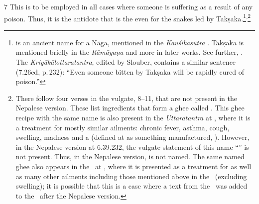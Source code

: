 \begin{translation}
\item[7]
                    This is to be employed in all cases where someone is
                    suffering as a result of any poison.  Thus, it is the
                    antidote that is  the  even for the snakes led by
                    Takṣaka.\footnote{ is an ancient name
                        for a Nāga, mentioned in the \emph{Kauśikasūtra}
                        \citep[28.1 \emph{et passim},][78]{bloo-1890}.
                        Takṣaka is mentioned briefly in the \emph{Rāmāyaṇa}
                        \citep[292, n.\,13]{poll-1991} and more in later
                        works. See further, \cite[22, 26, 37, \emph{et
                        passim}]{slou-2016}.  The
                        \emph{Kriyākālottaratantra}, edited by Slouber,
                        contains a similar sentence (7.26cd, p.\,232): “Even
                        someone bitten by Takṣaka will be rapidly cured of
                        poison.”}\textsuperscript{,}\footnote{There follow
                            four verses in the vulgate, 8--11, that are not
                            present in the Nepalese version.  These list
                            ingredients that form a ghee called
                            . This ghee recipe with
                            the same name is also present in the
                            \emph{Uttaratantra} at , where
                            it is a treatment for mostly similar ailments:
                            chronic fever, asthma, cough, swelling, madness and a
                             (defined at
                             as something manufactured,
                            ).  However, in the Nepalese version at
                            6.39.232, the vulgate statement of this name
                            “” is
                            not present. Thus, in the Nepalese version,
                             is not named. The same
                            named ghee also appears in the \CS\ at
                            , where it is presented as a
                            treatment for  as well as many
                            other ailments including those mentioned above in the
                            \SS\ (excluding swelling); it is possible that this
                            is a case where a text from the \CS\ was added to the
                            \SS\ after the Nepalese version.}
        

\end{translation}
